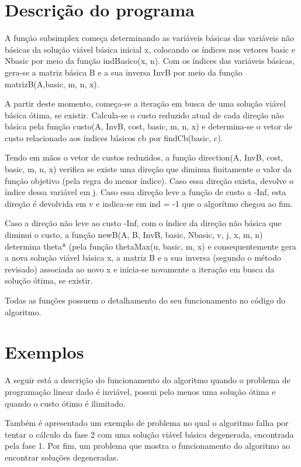 \documentclass[
	12pt,				%
	openright,			%
	oneside,			%
	a4paper,			%
	english,			%
	french,				%
	spanish,			%
	brazil,				%
	]{abntex2}
\begin{document}
\chapter{Descrição do programa}
A função subsimplex começa determinando as variáveis básicas das variáveis não básicas da solução viável básica
inicial x, colocando os índices nos vetores basic e Nbasic por meio da função indBasico(x, n). Com os índices
das variáveis básicas, gera-se a matriz básica B e a sua inversa InvB por meio da função matrizB(A,basic, m, n, x).


A partir deste momento, começa-se a iteração em busca de uma solução viável básica ótima, se existir.
Calcula-se o custo reduzido atual de cada direção não básica pela função custo(A, InvB, cost, basic, m, n, x) 
e determina-se o vetor de custo relacionado aos índices básicos cb por findCb(basic, c).


Tendo em mãos o vetor de custos reduzidos, a função direction(A, InvB, cost, basic, m, n, x) verifica
se existe uma direção que diminua finitamente o valor da função objetivo (pela regra do menor índice). 
Caso essa direção exista, devolve o índice dessa variável em j. Caso essa direção leve a função de custo a -Inf, esta direção é devolvida em v e indica-se em ind = -1 que o algorítmo chegou ao fim.


Caso a direção não leve ao custo -Inf, com o índice da direção não básica que diminui o custo, a função
newB(A, B, InvB, basic, Nbasic, v, j, x, m, n) determina theta* (pela função thetaMax(u, basic, m, x) e
consequentemente gera a nova solução viável básica x, a matriz B e a sua inversa (segundo o método revisado)
associada ao novo x e inicia-se novamente a iteração em busca da solução ótima, se existir.

Todas as funções possuem o detalhamento do seu funcionamento no código do algoritmo.
\chapter{Exemplos}

A seguir está a descrição do funcionamento do algoritmo quando o problema de
programação linear dado é inviável, possui pelo menos uma solução ótima e quando o custo 
ótimo é ilimitado. 

Também é apresentado um exemplo de problema no qual o algoritmo falha por tentar o cálculo da fase 2 com uma solução viável básica degenerada, encontrada pela fase 1. Por fim, um problema que mostra o funcionamento do algoritmo ao encontrar soluções degeneradas.
\end{document}
